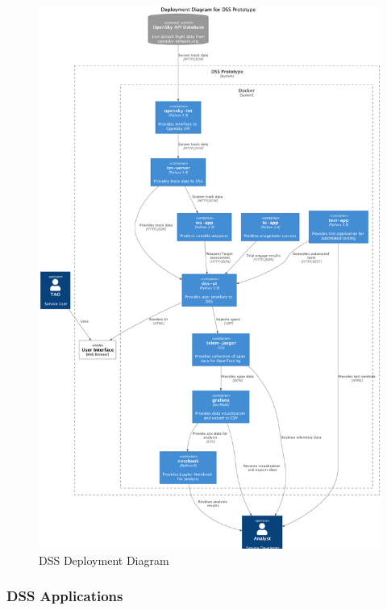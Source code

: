 \documentclass[
  letterpaper,
  DIV=11,
  numbers=noendperiod]{scrartcl}
\begin{document}
\begin{figure}

{\centering \includegraphics{dss-span-analysis-rev1_files/figure-pdf/fa6949b6-e2c7-4afc-89bd-057e476ef6cb.png}

}

\caption{DSS Deployment Diagram}

\end{figure}

\hypertarget{dss-applications}{%
\subsubsection{DSS Applications}\label{dss-applications}}
\end{document}
